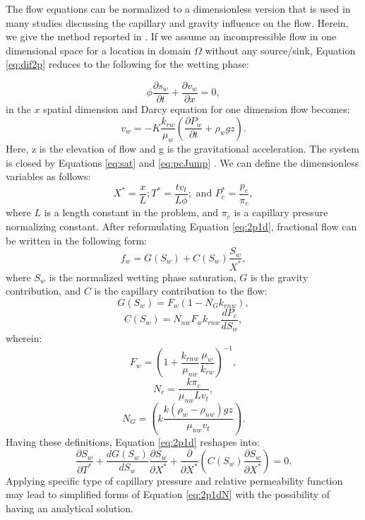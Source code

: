 The flow equations can be normalized to a dimensionless version that is used in
many studies discussing the capillary and gravity influence on the flow.
Herein, we give the method reported in \cite{fayers1959effect}. If we assume an
incompressible flow in one dimensional space for a location in domain $\Omega$
without any source/sink, Equation \ref{eq:dif2p} reduces to the following for
the wetting phase:

 \begin{equation}
  \phi \frac{\partial s_{w}}{\partial t}+ \frac {\partial v_w} {\partial x}=0,
  \label{eq:2p1d}
 \end{equation} in the $x$ spatial dimension and Darcy equation for one
dimension
flow becomes:
 \begin{equation}
  v_w=-K\frac{k_{rw}}{\mu_w}(\frac{\partial P_w}{\partial t} + \rho_w g z).
  \label{eq:D1d}
 \end{equation} Here, z is the elevation of flow and g is the gravitational
acceleration. The system is closed by Equations \ref{eq:sat} and \ref{eq:pcJump}
. We can define the dimensionless variables as follows:
 \begin{equation}
  X^*=\frac{x}{L};T^*=\frac{tv_t}{L\phi};\mbox{ and }P^*_c=\frac{p_c}{\pi_c},
  \label{eq:var*}
 \end{equation} where $L$ is a length constant in the problem, and $\pi_c$ is a
capillary pressure normalizing constant. After reformulating Equation
\ref{eq:2p1d}, fractional flow can be written in the following form:
 \begin{equation}
  f_w=G(S_w)+C(S_w)\frac{S_w}{X^*},
 \end{equation} where $S_w$ is the normalized wetting phase saturation, $G$ is
the gravity contribution, and $C$ is the capillary contribution to the flow:
 \begin{equation}
  G(S_w)=F_w(1-N_Gk_{rnw}),
  \label{eq:GrCont}
 \end{equation}
 \begin{equation}
  C(S_w)=N_{nw}F_wk_{rnw}\frac{dP_{c}}{dS_w},
  \label{eq:PcCont}
 \end{equation} wherein: 
 \begin{equation}
  F_w=(1+\frac{k_{rnw}}{\mu_{nw}}\frac{\mu_w}{k_{rw}})^{-1},
  \label{eq:Fn}
 \end{equation}
 \begin{equation}
  N_c=\frac{k\pi_c}{\mu_{nw}Lv_t},
  \label{eq:Nc}
 \end{equation}
 \begin{equation}
  N_G=(k\frac{k(\rho_w-\rho_{nw})gz}{\mu_{nw}v_t}).
  \label{eq:Fn}
 \end{equation} Having these definitions, Equation \ref{eq:2p1d} reshapes into:
 \begin{equation}
  \frac{\partial S_w}{\partial T^*}+\frac{dG(S_w)}{dS_w}\frac{\partial
S_w}{\partial X^*}+\frac{\partial}{\partial X^*}\left( C(S_w)\frac{\partial
S_w}{\partial X^*}\right)=0.
  \label{eq:2p1dN}
 \end{equation} Applying specific type of capillary pressure and relative
permeability function may lead to simplified forms of Equation \ref{eq:2p1dN}
with the possibility of having an analytical
solution\cite{yortsos1983analytical}. 


